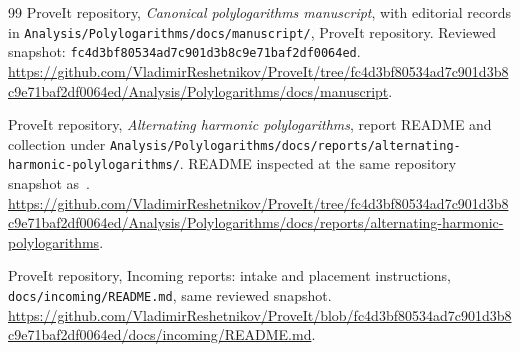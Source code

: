 \documentclass[11pt,oneside]{article}
\numberwithin{equation}{section}
\theoremstyle{definition}
\theoremstyle{remark}
\newcommand{\src}[1]{\nolinkurl{#1}}
\begin{document}
\begin{thebibliography}{99}
ProveIt repository, \emph{Canonical polylogarithms manuscript},
with editorial records in
\src{Analysis/Polylogarithms/docs/manuscript/}, ProveIt repository.
Reviewed snapshot:
\src{fc4d3bf80534ad7c901d3b8c9e71baf2df0064ed}.
\url{https://github.com/VladimirReshetnikov/ProveIt/tree/fc4d3bf80534ad7c901d3b8c9e71baf2df0064ed/Analysis/Polylogarithms/docs/manuscript}.

ProveIt repository, \emph{Alternating harmonic polylogarithms},
report README and collection under
\src{Analysis/Polylogarithms/docs/reports/alternating-harmonic-polylogarithms/}.
README inspected at the same repository snapshot as~\cite{repo}.
\url{https://github.com/VladimirReshetnikov/ProveIt/tree/fc4d3bf80534ad7c901d3b8c9e71baf2df0064ed/Analysis/Polylogarithms/docs/reports/alternating-harmonic-polylogarithms}.

ProveIt repository, Incoming reports: intake and placement instructions,
\src{docs/incoming/README.md}, same reviewed snapshot.
\url{https://github.com/VladimirReshetnikov/ProveIt/blob/fc4d3bf80534ad7c901d3b8c9e71baf2df0064ed/docs/incoming/README.md}.

\end{thebibliography}
\end{document}

